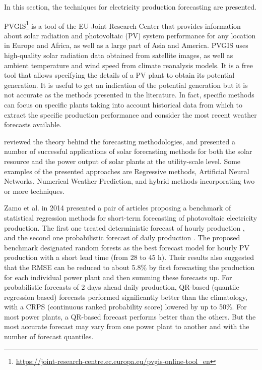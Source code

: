 In this section, the techniques for electricity production forecasting are presented.

PVGIS\footnote{ \url{https://joint-research-centre.ec.europa.eu/pvgis-online-tool_en} } is a tool of the EU-Joint Research Center that provides information about solar radiation and photovoltaic (PV) system performance for any location in Europe and Africa, as well as a large part of Asia and America.
PVGIS uses high-quality solar radiation data obtained from satellite images, as well as ambient temperature and wind speed from climate reanalysis models.
It is a free tool that allows specifying the details of a PV plant to obtain its potential generation.
It is useful to get an indication of the potential generation but it is not accurate as the methods presented in the literature.
In fact, specific methods can focus on specific plants taking into account historical data from which to extract the specific production performance and consider the most recent weather forecasts available.

\cite{INMAN2013535} reviewed the theory behind the forecasting methodologies, and presented a number of successful applications of solar forecasting methods for both the solar resource and the power output of solar plants at the utility-scale level.
Some examples of the presented approaches are Regressive methods, Artificial Neural Networks, Numerical Weather Prediction, and hybrid methods incorporating two or more techniques.

Zamo et al. in 2014 presented a pair of articles proposing a benchmark of statistical regression methods for short-term forecasting of photovoltaic electricity production.
The first one treated deterministic forecast of hourly production \cite{ZAMO2014792}, and the second one probabilistic forecast of daily production \cite{ZAMO2014804}.
The proposed benchmark designated random forests as the best forecast model for hourly PV production with a short lead time (from 28 to 45 h).
Their results also suggested that the RMSE can be reduced to about 5.8\% by first forecasting the production for each individual power plant and then summing these forecasts up.
For probabilistic forecasts of 2 days ahead daily production, QR-based (quantile regression based) forecasts performed significantly better than the climatology, with a CRPS (continuous ranked probability score) lowered by up to 50\%.
For most power plants, a QR-based forecast performs better than the others.
But the most accurate forecast may vary from one power plant to another and with the number of forecast quantiles.

